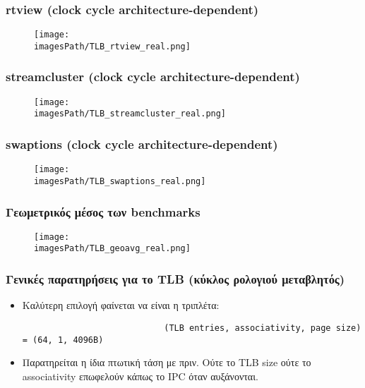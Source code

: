 \documentclass[12pt,a4paper]{article}
\newcommand{\imagesPath}{parsec-3.0/parsec_workspace/graphs}
\begin{document}
			\subsubsection{rtview (clock cycle architecture-dependent)}
				\begin{figure}[H]
					\begin{center}
						\texttt{[image: \\imagesPath/TLB\_rtview\_real.png]}
					\end{center}
				\end{figure}
						
			\subsubsection{streamcluster (clock cycle architecture-dependent)}
				\begin{figure}[H]
					\begin{center}
						\texttt{[image: \\imagesPath/TLB\_streamcluster\_real.png]}
					\end{center}
				\end{figure}
						
			\subsubsection{swaptions (clock cycle architecture-dependent)}
				\begin{figure}[H]
					\begin{center}
						\texttt{[image: \\imagesPath/TLB\_swaptions\_real.png]}
					\end{center}
				\end{figure}
						
			\subsubsection{Γεωμετρικός μέσος των benchmarks}
				\begin{figure}[H]
					\begin{center}
						\texttt{[image: \\imagesPath/TLB\_geoavg\_real.png]}
					\end{center}
				\end{figure}
					
			\subsubsection{Γενικές παρατηρήσεις για το TLB (κύκλος ρολογιού μεταβλητός)}
				\begin{itemize}
					\item Καλύτερη επιλογή φαίνεται να είναι η τριπλέτα:
						
						\begin{verbatim}
							(TLB entries, associativity, page size) = (64, 1, 4096B)
						\end{verbatim}
					\item Παρατηρείται η ίδια πτωτική τάση με πριν. Ούτε το TLB size ούτε το associativity επωφελούν κάπως το IPC όταν αυξάνονται.
				\end{itemize}
\end{document}
